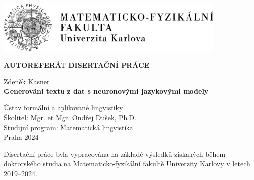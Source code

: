 \documentclass[12pt,notitlepage,a4paper,openright]{report}
\begin{document}
\cleardoublepage{}

\begin{titlepage}
  \begin{center}
    \ \\

    \vspace{20mm}

    \includegraphics[height=25mm]{logo-mff-cz.png}

    \vspace{30mm}

    {\Large\bf \uppercase{Autoreferát disertační práce}}

    \vspace{20mm}

    {\Large\textnormal Zdeněk Kasner}\\

    \vspace{\gapsize}
    {\Large\bf Generování textu z dat s neuronovými jazykovými modely}\\
  \end{center}
  \vspace{1mm}
  \begin{center}
    \large
    Ústav formální a aplikované lingvistiky\\
    \vspace{\gapsize}
    \noindent Školitel: Mgr. et Mgr. Ondřej Dušek, Ph.D.\\
    \vspace{\gapsize}
    {%
      \noindent Studijní program: Matematická lingvistika\\
    }
    \vspace{\gapsize}
    Praha 2024
  \end{center}
\end{titlepage}


\pagestyle{plain}
\normalsize

\noindent Disertační práce byla vypracována na základě výsledků získaných během doktorského studia na Matematicko-fyzikální fakultě Univerzity Karlovy v letech 2019–2024.
\end{document}

